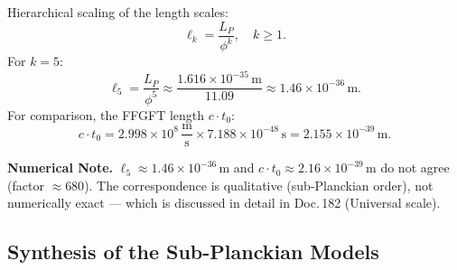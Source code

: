 Hierarchical scaling of the length scales:
\begin{equation}
  \ell_k = \frac{L_P}{\phi^k},\quad k \ge 1.
\end{equation}
For $k=5$:
\begin{equation}
  \ell_5 = \frac{L_P}{\phi^5}
         \approx \frac{1.616 \times 10^{-35}\,\text{m}}{11.09}
         \approx 1.46 \times 10^{-36}\,\text{m}.
\end{equation}
For comparison, the FFGFT length $c\cdot t_0$:
\begin{equation}
  c \cdot t_0
  = 2.998 \times 10^8\,\frac{\text{m}}{\text{s}}
    \times 7.188 \times 10^{-48}\,\text{s}
  = 2.155 \times 10^{-39}\,\text{m}.
\end{equation}

\begin{warnbox}
\textbf{Numerical Note.}
$\ell_5 \approx 1.46 \times 10^{-36}\,\text{m}$ and
$c\cdot t_0 \approx 2.16 \times 10^{-39}\,\text{m}$
do not agree (factor $\approx 680$).
The correspondence is qualitative (sub-Planckian order), not numerically
exact — which is discussed in detail in Doc.\,182 (Universal scale).
\end{warnbox}

\subsection{Synthesis of the Sub-Planckian Models}

\begin{table}[H]
\centering
\caption{Comparison of sub-Planckian models}
\smallskip
{}
\end{table}

